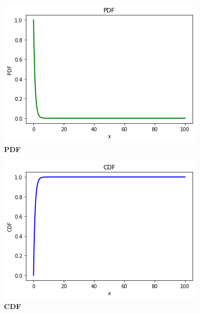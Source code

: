 \documentclass[journal,12pt,twocolumn]{IEEEtran}
\begin{document}
\begin{figure}
\includegraphics[width=\columnwidth]{figure_1.png}
    \caption{\textbf{\huge{PDF}}} 
\end{figure}
\begin{figure}
\includegraphics[width=\columnwidth]{figure_2.png}
    \caption{\textbf{\huge{CDF}}}
\end{figure}
\end{document}

